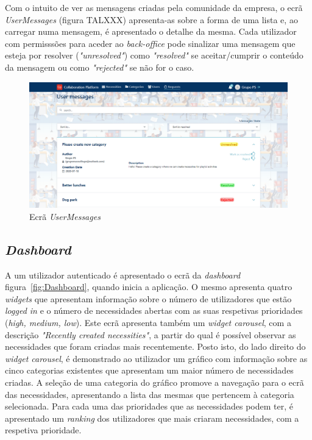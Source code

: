 Com o intuito de ver as mensagens criadas pela comunidade da empresa, o ecrã \textit{UserMessages} (figura TALXXX) apresenta-as sobre a forma de uma lista e,
ao carregar numa mensagem, é apresentado o detalhe da mesma. 
Cada utilizador com permisssões para aceder ao \textit{back-office} pode sinalizar uma mensagem que esteja por resolver (\textit{"unresolved"}) como \textit{"resolved"} se aceitar/cumprir o conteúdo da mensagem ou como \textit{"rejected"} se não for o caso.  

\begin{figure}[H]
  \centering 
  \includegraphics[scale=0.35]{figures/backoffice_userMessages.png}
  \caption{Ecrã \textit{UserMessages}}\label{fig:backoffice_user_messages}
\end{figure}



\subsection{\textit{Dashboard}}\label{subsec:implementacao:dashboard}

A um utilizador autenticado é apresentado o ecrã da \textit{dashboard} figura~\ref{fig:Dashboard}, quando inicia a aplicação.
O mesmo apresenta quatro \textit{widgets} que apresentam informação sobre o número de utilizadores que estão \textit{logged in} e o número de necessidades abertas com as suas respetivas prioridades (\textit{high, medium, low}).
Este ecrã apresenta também um \textit{widget carousel}, com a descrição \textit{"Recently created necessities"}, a partir do qual é possível observar as necessidades que foram criadas mais recentemente. 
Posto isto, do lado direito do \textit{widget carousel}, é demonstrado ao utilizador um gráfico com informação sobre as cinco categorias existentes que apresentam um maior número de necessidades criadas.
A seleção de uma categoria do gráfico promove a navegação para o ecrã das necessidades,  apresentando a lista das mesmas que pertencem à categoria selecionada.
Para cada uma das prioridades que as necessidades podem ter, é apresentado um \textit{ranking} dos utilizadores que mais criaram necessidades, com a respetiva prioridade.

